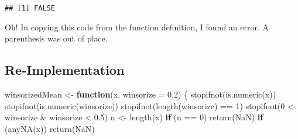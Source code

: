 \documentclass[
]{article}
\newenvironment{Shaded}{\begin{snugshade}}{\end{snugshade}}
\newcommand{\AttributeTok}[1]{\textcolor[rgb]{0.77,0.63,0.00}{#1}}
\newcommand{\ConstantTok}[1]{\textcolor[rgb]{0.00,0.00,0.00}{#1}}
\newcommand{\ControlFlowTok}[1]{\textcolor[rgb]{0.13,0.29,0.53}{\textbf{#1}}}
\newcommand{\DecValTok}[1]{\textcolor[rgb]{0.00,0.00,0.81}{#1}}
\newcommand{\FloatTok}[1]{\textcolor[rgb]{0.00,0.00,0.81}{#1}}
\newcommand{\FunctionTok}[1]{\textcolor[rgb]{0.00,0.00,0.00}{#1}}
\newcommand{\NormalTok}[1]{#1}
\newcommand{\OtherTok}[1]{\textcolor[rgb]{0.56,0.35,0.01}{#1}}
\newcommand{\SpecialCharTok}[1]{\textcolor[rgb]{0.00,0.00,0.00}{#1}}
\begin{document}
\begin{verbatim}
## [1] FALSE
\end{verbatim}

Oh! In copying this code from the function definition, I found an error.
A parenthesis was out of place.

\hypertarget{re-implementation}{%
\subsection{Re-Implementation}\label{re-implementation}}

\begin{Shaded}
\begin{Highlighting}[]
\NormalTok{winsorizedMean }\OtherTok{\textless{}{-}} \ControlFlowTok{function}\NormalTok{(x, }\AttributeTok{winsorize =} \FloatTok{0.2}\NormalTok{) \{}
    \FunctionTok{stopifnot}\NormalTok{(}\FunctionTok{is.numeric}\NormalTok{(x))}
    \FunctionTok{stopifnot}\NormalTok{(}\FunctionTok{is.numeric}\NormalTok{(winsorize))}
    \FunctionTok{stopifnot}\NormalTok{(}\FunctionTok{length}\NormalTok{(winsorize) }\SpecialCharTok{==} \DecValTok{1}\NormalTok{)}
    \FunctionTok{stopifnot}\NormalTok{(}\DecValTok{0} \SpecialCharTok{\textless{}}\NormalTok{ winsorize }\SpecialCharTok{\&}\NormalTok{ winsorize }\SpecialCharTok{\textless{}} \FloatTok{0.5}\NormalTok{)}
\NormalTok{    n }\OtherTok{\textless{}{-}} \FunctionTok{length}\NormalTok{(x)}
    \ControlFlowTok{if}\NormalTok{ (n }\SpecialCharTok{==} \DecValTok{0}\NormalTok{) }\FunctionTok{return}\NormalTok{(}\ConstantTok{NaN}\NormalTok{)}
    \ControlFlowTok{if}\NormalTok{ (}\FunctionTok{anyNA}\NormalTok{(x)) }\FunctionTok{return}\NormalTok{(}\ConstantTok{NaN}\NormalTok{)}


\end{Highlighting}
\end{Shaded}
\end{document}
